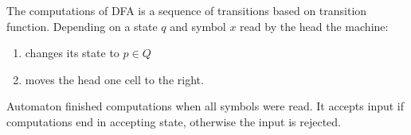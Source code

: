 \documentclass{article}
\begin{document}
\begin{itemize}
The computations of DFA is a sequence of transitions based on transition function.
Depending on a state $q$ and symbol $x$ read by the head the machine:
\begin{enumerate}
	\item changes its state to $p \in Q$
	\item moves the head one cell to the right.
\end{enumerate}

Automaton finished computations when all symbols were read. It accepts input if computations end in accepting state, otherwise the input is rejected.



\end{itemize}



\end{document}
